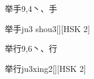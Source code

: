 \begin{entry}{举手}{9,4}{⼂、⼿}
  \begin{phonetics}{举手}{ju3 shou3}[][HSK 2]
  \end{phonetics}
\end{entry}

\begin{entry}{举行}{9,6}{⼂、⾏}
  \begin{phonetics}{举行}{ju3xing2}[][HSK 2]
  \end{phonetics}
\end{entry}



